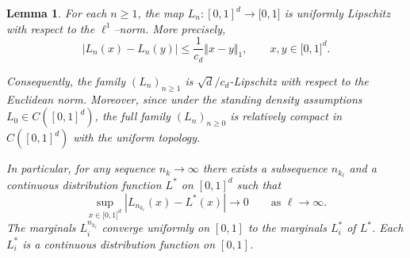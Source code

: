 \documentclass[onecolumn]{article}
\newtheorem{lemma}[theorem]{Lemma}
\begin{document}
\begin{lemma}
\noindent \label{L-Lip-d} For each $n\geq 1$, the map $L_{n}:[0,1]^{d}%
\rightarrow \lbrack 0,1]$ is uniformly Lipschitz with respect to the $\ell
^{1}$--norm. More precisely, 
\begin{equation}
|L_{n}(x)-L_{n}(y)|\leq \frac{1}{c_{d}}\Vert x-y\Vert _{1},\qquad x,y\in
\lbrack 0,1]^{d}.  \label{4002}
\end{equation}

Consequently, the family $(L_{n})_{n\geq 1}$ is $\sqrt{d}/c_{d}$-Lipschitz
with respect to the Euclidean norm. Moreover, since under the standing
density assumptions $L_{0}\in C([0,1]^{d})$, the full family $(L_{n})_{n\geq
0}$ is relatively compact in $C([0,1]^{d})$ with the uniform topology.

\noindent In particular, for any sequence $n_{k}\rightarrow \infty $ there
exists a subsequence $n_{k_{\ell }}$ and a continuous distribution function $%
L^{\ast }$ on $[0,1]^{d}$ such that 
\begin{equation}
\sup_{x\in \lbrack 0,1]^{d}}|L_{n_{k_{\ell }}}(x)-L^{\ast }(x)|\rightarrow
0\qquad \text{as }\ell \rightarrow \infty .  \label{4003}
\end{equation}%
The marginals $L_{i}^{n_{k_{\ell }}}$ converge uniformly on $[0,1]$ to the
marginals $L_{i}^{\ast }$ of $L^{\ast }$. Each $L_{i}^{\ast }$ is a
continuous distribution function on $[0,1]$.
\end{lemma}
\end{document}
